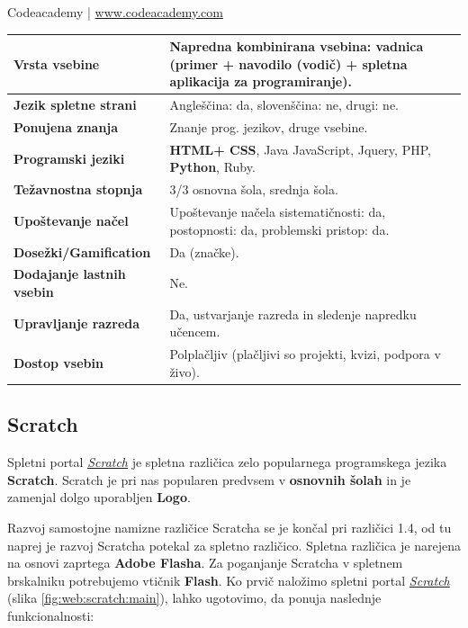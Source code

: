 \begin{osebnabox}[label={osebna:codeacademy}]{Codeacademy | \url{www.codeacademy.com}}
    \begin{tabular}{
  p{} |
  p{}  }
  \textbf{Vrsta vsebine} & Napredna kombinirana vsebina: vadnica
                           (primer +  navodilo (vodič) + spletna
                           aplikacija za programiranje).  \\
      \hline
  \textbf{Jezik spletne strani} &  Angleščina: da, slovenščina: ne,
                                  drugi: ne. \\
      \hline
  \textbf{Ponujena znanja} & Znanje prog. jezikov, druge vsebine. \\
      \hline
 \textbf{Programski jeziki} & \textbf{HTML+ CSS}, Java JavaScript, Jquery, PHP,
                              \textbf{Python}, Ruby. \\
      \hline
  \textbf{Težavnostna stopnja} & 3/3 osnovna šola, srednja šola. \\
      \hline
   \textbf{Upoštevanje načel} & Upoštevanje načela sistematičnosti: da,
      postopnosti: da, problemski pristop: da. \\
      \hline
  \textbf{Dosežki/Gamification} & Da (značke). \\
      \hline
  \textbf{Dodajanje lastnih vsebin} & Ne. \\
      \hline
  \textbf{Upravljanje razreda} &Da, ustvarjanje razreda in sledenje
                                 napredku učencem. \\
      \hline
  \textbf{Dostop vsebin} & Polplačljiv (plačljivi so projekti, kvizi,
                           podpora v živo). \\
\end{tabular}
\end{osebnabox}

\subsection{Scratch}
\label{sec:scratch}

Spletni portal \emph{\href{https://scratch.mit.edu/}{Scratch}}
\cite{web:scratch} je spletna različica zelo popularnega programskega
jezika \textbf{Scratch}. Scratch je pri nas popularen predvsem v
\textbf{osnovnih šolah} in je zamenjal dolgo uporabljen \textbf{Logo}.

Razvoj samostojne namizne različice Scratcha se je končal pri različici
1.4, od tu naprej je razvoj Scratcha potekal za spletno
različico. Spletna različica je narejena na osnovi zaprtega
\textbf{Adobe Flasha}. Za poganjanje Scratcha v spletnem brskalniku
potrebujemo vtičnik \textbf{Flash}. Ko prvič naložimo spletni portal
\emph{\href{https://scratch.mit.edu/}{Scratch}} (slika
\ref{fig:web:scratch:main}), lahko ugotovimo, da ponuja naslednje
funkcionalnosti:

